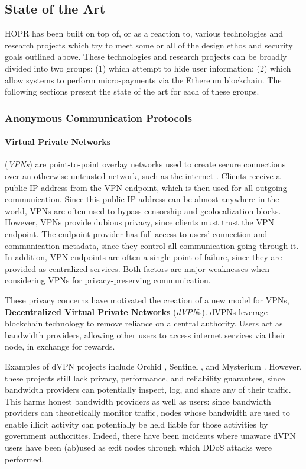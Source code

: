 \subsection{State of the Art}
\label{sec:stateoftheart}

HOPR has been built on top of, or as a reaction to, various technologies and research projects which try to meet some or all of the design ethos and security goals outlined above. These technologies and research projects can be broadly divided into two groups: (1)  which attempt to hide user information; (2)  which allow systems to perform micro-payments via the Ethereum blockchain. The following sections present the state of the art for each of these groups.

\subsubsection{Anonymous Communication Protocols}
\label{sec:privacyprotocols}

\paragraph{Virtual Private Networks}(\textit{VPNs}) are point-to-point overlay networks used to create secure connections over an otherwise untrusted network, such as the internet \cite{venkateswaran_2001}. Clients receive a public IP address from the VPN endpoint, which is then used for all outgoing communication. Since this public IP address can be almost anywhere in the world, VPNs are often used to bypass censorship \cite{hobbs_roberts_2018} and geolocalization blocks. However, VPNs provide dubious privacy, since clients must trust the VPN endpoint. The endpoint provider has full access to users' connection and communication metadata, since they control all communication going through it. In addition, VPN endpoints are often a single point of failure, since they are provided as centralized services. Both factors are major weaknesses when considering VPNs for privacy-preserving communication.

These privacy concerns have motivated the creation of a new model for VPNs, \textbf{Decentralized Virtual Private Networks} (\textit{dVPN}s). dVPNs leverage blockchain technology to remove reliance on a central authority. Users act as bandwidth providers, allowing other users to access internet services via their node, in exchange for rewards.

Examples of dVPN projects include Orchid \cite{orchid}, Sentinel \cite{sentinel}, and Mysterium \cite{mysterium}. However, these projects still lack privacy, performance, and reliability guarantees, since bandwidth providers can potentially inspect, log, and share any of their traffic. This harms honest bandwidth providers as well as users: since bandwidth providers can theoretically monitor traffic, nodes whose bandwidth are used to enable illicit activity can potentially be held liable for those activities by government authorities. Indeed, there have been incidents where unaware dVPN users have been (ab)used as exit nodes through which DDoS attacks
were performed.


